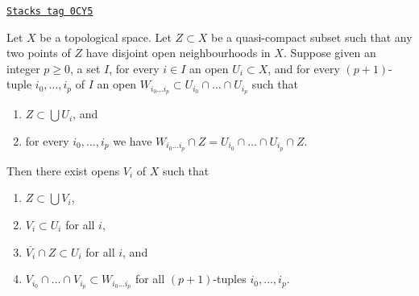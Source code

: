 \begin{lemma}
\label{topology-lemma-lift-covering-of-quasi-compact-hausdorff-subset}
\href{https://stacks.math.columbia.edu/tag/0CY5}{\texttt{Stacks tag 0CY5}}

Let $X$ be a topological space. Let $Z \subset X$ be a quasi-compact subset
such that any two points of $Z$ have disjoint open neighbourhoods in $X$.
Suppose given an integer $p \geq 0$, a set $I$, for every $i \in I$
an open $U_i \subset X$, and for every $(p + 1)$-tuple
$i_0, \ldots, i_p$ of $I$ an open
$W_{i_0 \ldots i_p} \subset U_{i_0} \cap \ldots \cap U_{i_p}$
such that
\begin{enumerate}
\item $Z \subset \bigcup U_i$, and
\item for every $i_0, \ldots, i_p$ we have
$W_{i_0 \ldots i_p} \cap Z = U_{i_0} \cap \ldots \cap U_{i_p} \cap Z$.
\end{enumerate}
Then there exist opens $V_i$ of $X$ such that
\begin{enumerate}
\item $Z \subset \bigcup V_i$,
\item $V_i \subset U_i$ for all $i$,
\item $\overline{V_i} \cap Z \subset U_i$ for all $i$, and
\item $V_{i_0} \cap \ldots \cap V_{i_p} \subset W_{i_0 \ldots i_p}$
for all $(p + 1)$-tuples $i_0, \ldots, i_p$.
\end{enumerate}
\end{lemma}

